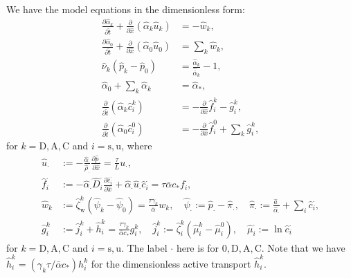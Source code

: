 \documentclass{article}
\begin{document}
We have the model equations in the dimensionless form:
\begin{align}
    \frac{\partial \hat{\alpha}_k}{\partial \hat{t}}  + \frac{\partial}{\partial \hat{x}}\left( \hat{\alpha}_k \hat{u}_k \right) &= - \hat{w}_k,\\ \label{eq:nd_1steq}
    \frac{\partial\hat{\alpha}_0}{\partial \hat{t}}+\frac{\partial}{\partial \hat{x}}\left( \hat{\alpha}_0 \hat{u}_0 \right) &=\sum_k \hat{w}_k,\\
    \hat{\nu}_k\left( \hat{p}_k - \hat{p}_0 \right) &= \frac{\hat{\alpha}_k}{\hat{\bar{\alpha}}_k}-1,\\
    \hat{\alpha}_0 + \sum_{k} \hat{\alpha}_k &= \hat{\alpha}_*,\\
    \frac{\partial}{\partial \hat{t}}\left( \hat{\alpha}_k \hat{c}_i^k \right)&=-\frac{\partial}{\partial \hat{x}} \hat{f}_i^k - \hat{g}_i^k,\\
    \frac{\partial}{\partial \hat{t}}\left( \hat{\alpha}_0 \hat{c}_i^0 \right)&=-\frac{\partial}{\partial \hat{x}} \hat{f}_i^0 + \sum_k \hat{g}_i^k,
\end{align}
    for $k=\mathrm{D},\mathrm{A},\mathrm{C}$ and $i=\mathrm{s},\mathrm{u}$, where
\begin{align}
    \hat{u}_\cdot &:= -\frac{\hat{\alpha}_\cdot}{\hat{\rho}_\cdot}\frac{\partial \hat{p}_\cdot}{\partial \hat{x}} = \frac{\tau}{L}u_\cdot,\\
    \hat{f}_i^\cdot &:= -\hat{\alpha}_\cdot\hat{D}_i^\cdot \frac{\partial \hat{c}_i^\cdot}{\partial \hat{x}} + \hat{\alpha}_\cdot\hat{u}_\cdot\hat{c}_i^\cdot=\tau\bar{\alpha}c_* f_i^\cdot,\\
    \hat{w}_k&:= \hat{\zeta}_\mathrm{w}^k\left( \hat{\psi}_k-\hat{\psi}_0 \right)=\frac{\tau\gamma_k}{\bar{\alpha}}w_k,\quad\hat{\psi}_\cdot := \hat{p}_\cdot - \hat{\pi}_.,\quad \hat{\pi}_\cdot := \frac{\hat{a}_\cdot}{\hat{\alpha}_\cdot}+\sum_i \hat{c}_i^\cdot,\\
    \hat{g}_i^k &:= \hat{j}_i^k+\hat{h}_i^k=\frac{\tau \gamma_k}{\bar{\alpha}c_*}g_i^k,\quad \hat{j}_i^k :=\hat{\zeta}_i^k(\hat{\mu}_i^k-\hat{\mu}_i^0),\quad \hat{\mu}_i^\cdot:=\ln \hat{c}_i^\cdot\label{eq:nd_lasteq}
\end{align}
    for $k=\mathrm{D},\mathrm{A},\mathrm{C}$ and $i=\mathrm{s},\mathrm{u}$.
The label $\cdot$ here is for $0,\mathrm{D},\mathrm{A},\mathrm{C}$.
Note that we have $\hat{h}_i^k=(\gamma_k\tau/\bar{\alpha}c_*)h_i^k$ for the dimensionless active transport $\hat{h}_i^k$.
\end{document}
